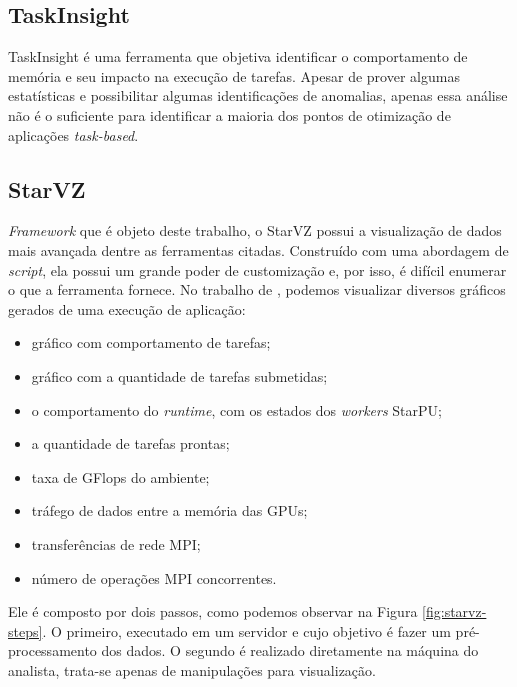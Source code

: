 \documentclass[ppgc,espec]{iiufrgs}
\begin{document}
\subsection{TaskInsight}

TaskInsight \cite{ref:taskinsight} é uma ferramenta que objetiva identificar o comportamento de memória e seu impacto na execução de tarefas. 
Apesar de prover algumas estatísticas e possibilitar algumas identificações de anomalias, apenas essa análise não é o suficiente para
identificar a maioria dos pontos de otimização de aplicações \emph{task-based}.

\subsection{StarVZ}

\emph{Framework} que é objeto deste trabalho, o StarVZ \cite{ref:starvz} possui a visualização de dados mais avançada dentre as ferramentas citadas.
Construído com uma abordagem de \emph{script}, ela possui um grande poder de customização e, por isso, é difícil enumerar o que a ferramenta fornece.
No trabalho de \citet{ref:starvz}, podemos visualizar diversos gráficos gerados de uma execução de aplicação:

\begin{itemize}
    \item gráfico com comportamento de tarefas;
    \item gráfico com a quantidade de tarefas submetidas;
    \item o comportamento do \emph{runtime}, com os estados dos \emph{workers} StarPU;
    \item a quantidade de tarefas prontas;
    \item taxa de GFlops do ambiente;
    \item tráfego de dados entre a memória das GPUs;
    \item transferências de rede MPI;
    \item número de operações MPI concorrentes.
\end{itemize}

Ele é composto por dois passos, como podemos observar na Figura \ref{fig:starvz-steps}. O primeiro, executado em um servidor e cujo objetivo é fazer um pré-processamento dos dados. O segundo é realizado diretamente na máquina do analista, trata-se apenas de manipulações para visualização.
\end{document}
